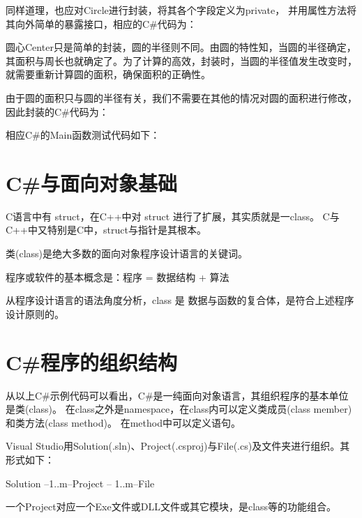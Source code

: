 同样道理，也应对Circle进行封装，将其各个字段定义为private，
并用属性方法将其向外简单的暴露接口，相应的C\#代码为：



圆心Center只是简单的封装，圆的半径则不同。由圆的特性知，当圆的半径确定，
其面积与周长也就确定了。为了计算的高效，封装时，当圆的半径值发生改变时，
就需要重新计算圆的面积，确保面积的正确性。

由于圆的面积只与圆的半径有关，我们不需要在其他的情况对圆的面积进行修改，
因此封装的C\#代码为：




相应C\#的Main函数测试代码如下：



\section{C\#与面向对象基础}
C语言中有 struct，在C++中对 struct 进行了扩展，其实质就是一class。
C与C++中又特别是C中，struct与指针是其根本。

类(class)是绝大多数的面向对象程序设计语言的关键词。

程序或软件的基本概念是：程序 = 数据结构 + 算法

从程序设计语言的语法角度分析，class 是 数据与函数的复合体，是符合上述程序设计原则的。

\section{ C\#程序的组织结构}

 从以上C\#示例代码可以看出，C\#是一纯面向对象语言，其组织程序的基本单位是类(class)。
 在class之外是namespace，在class内可以定义类成员(class member)和类方法(class method)。
 在method中可以定义语句。

 Visual Studio用Solution(.sln)、Project(.csproj)与File(.cs)及文件夹进行组织。其形式如下：

 Solution --1..m--Project -- 1..m--File

 一个Project对应一个Exe文件或DLL文件或其它模块，是class等的功能组合。